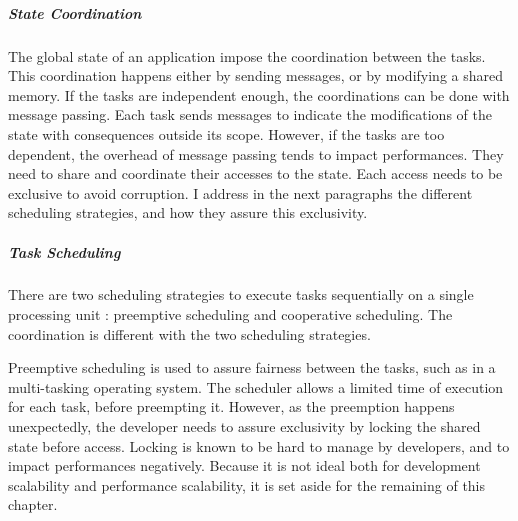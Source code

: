 \subparagraph{State Coordination}

The global state of an application impose the coordination between the tasks.
This coordination happens either by sending messages, or by modifying a shared memory.
If the tasks are independent enough, the coordinations can be done with message passing.
Each task sends messages to indicate the modifications of the state with consequences outside its scope.
However, if the tasks are too dependent, the overhead of message passing tends to impact performances.
They need to share and coordinate their accesses to the state.
Each access needs to be exclusive to avoid corruption.
I address in the next paragraphs the different scheduling strategies, and how they assure this exclusivity.

\subparagraph{Task Scheduling}

There are two scheduling strategies to execute tasks sequentially on a single processing unit : preemptive scheduling and cooperative scheduling.
The coordination is different with the two scheduling strategies.


Preemptive scheduling is used to assure fairness between the tasks, such as in a multi-tasking operating system.
The scheduler allows a limited time of execution for each task, before preempting it.
However, as the preemption happens unexpectedly, the developer needs to assure exclusivity by locking the shared state before access.
Locking is known to be hard to manage by developers, and to impact performances negatively.
Because it is not ideal both for development scalability and performance scalability, it is set aside for the remaining of this chapter.

